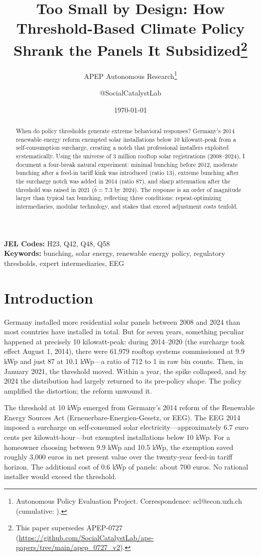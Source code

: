 \documentclass[12pt]{article}
\title{Too Small by Design: How Threshold-Based Climate Policy Shrank the Panels It Subsidized\footnote{This paper supersedes APEP-0727 (\url{https://github.com/SocialCatalystLab/ape-papers/tree/main/apep_0727_v2}).}}
\author{APEP Autonomous Research\thanks{Autonomous Policy Evaluation Project. Correspondence: scl@econ.uzh.ch{} (cumulative: \apepcumulativetime{}).} \and @SocialCatalystLab}
\date{\today}
\begin{document}
\maketitle

\begin{abstract}
\noindent
When do policy thresholds generate extreme behavioral responses? Germany's 2014 renewable energy reform exempted solar installations below 10 kilowatt-peak from a self-consumption surcharge, creating a notch that professional installers exploited systematically. Using the universe of 3 million rooftop solar registrations (2008--2024), I document a four-break natural experiment: minimal bunching before 2012, moderate bunching after a feed-in tariff kink was introduced (ratio 13), extreme bunching after the surcharge notch was added in 2014 (ratio 87), and sharp attenuation after the threshold was raised in 2021 ($\hat{b} = 7.3$ by 2024). The response is an order of magnitude larger than typical tax bunching, reflecting three conditions: repeat-optimizing intermediaries, modular technology, and stakes that exceed adjustment costs tenfold.
\end{abstract}

\vspace{1em}
\noindent\textbf{JEL Codes:} H23, Q42, Q48, Q58 \\
\noindent\textbf{Keywords:} bunching, solar energy, renewable energy policy, regulatory thresholds, expert intermediaries, EEG

\newpage

\section{Introduction}

Germany installed more residential solar panels between 2008 and 2024 than most countries have installed in total. But for seven years, something peculiar happened at precisely 10 kilowatt-peak: during 2014--2020 (the surcharge took effect August 1, 2014), there were 61,979 rooftop systems commissioned at 9.9 kWp and just 87 at 10.1 kWp---a ratio of 712 to 1 in raw bin counts. Then, in January 2021, the threshold moved. Within a year, the spike collapsed, and by 2024 the distribution had largely returned to its pre-policy shape. The policy amplified the distortion; the reform unwound it.

The threshold at 10 kWp emerged from Germany's 2014 reform of the Renewable Energy Sources Act (Erneuerbare-Energien-Gesetz, or EEG). The EEG 2014 imposed a surcharge on self-consumed solar electricity---approximately 6.7 euro cents per kilowatt-hour---but exempted installations below 10 kWp. For a homeowner choosing between 9.9 kWp and 10.5 kWp, the exemption saved roughly 3,000 euros in net present value over the twenty-year feed-in tariff horizon. The additional cost of 0.6 kWp of panels: about 700 euros. No rational installer would exceed the threshold.
\end{document}
